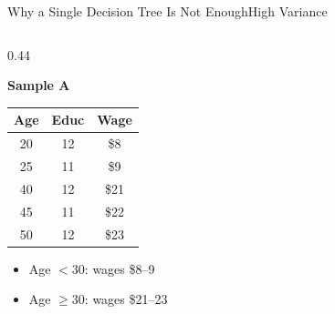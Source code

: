 \documentclass[dvipsnames,hyperref={pdfpagelabels=false}]{beamer}
\begin{document}
\begin{frame}{Why a Single Decision Tree Is Not Enough}{High Variance}
\begin{columns}[T]

\begin{column}{0.44\textwidth}
  \begin{center}\textbf{Sample A}\end{center}
  \begin{center}\small
  \begin{tabular}{@{}ccc@{}}
    \toprule
    Age & Educ & Wage \\
    \midrule
    20 & 12 & \$8  \\
    25 & 11 & \$9  \\
    40 & 12 & \$21 \\
    45 & 11 & \$22 \\
    50 & 12 & \$23 \\
    \bottomrule
  \end{tabular}
  \end{center}
  \begin{itemize}\small
    \item Age $<30$: wages \$8--9
          \vspace{0.1cm}

    \item Age $\geq30$: wages \$21--23


\end{itemize}
\end{column}
\end{columns}
\end{frame}
\end{document}
